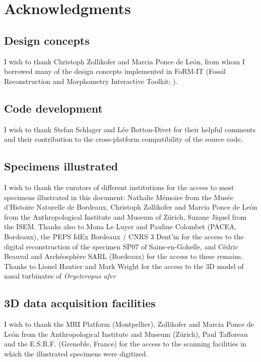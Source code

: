 
\chapter{Acknowledgments}
\minitoc 

\section {Design concepts}
I wish to thank Christoph Zollikofer and Marcia Ponce de León, from whom I borrowed many of the design concepts implemented in FoRM-IT (Fossil Reconstruction and Morphometry Interactive Toolkit; \citep{Zollikofer1995,Zollikofer2005}).

\section {Code development}
 I wish to thank Stefan Schlager and Léo Botton-Divet for their helpful comments and their contribution to the cross-platform compatibility of the source code.  

\section{Specimens illustrated} 
I wish to thank the curators of different institutions for the access to most specimens illustrated
in this document: Nathalie Mémoire from the Musée d'Histoire Naturelle de Bordeaux, Christoph
Zollikofer and Marcia Ponce de León from the Anthropological Institute and Museum of Zürich, Suzane Jiquel from the ISEM. Thanks also to Mona Le Luyer and Pauline Colombet (PACEA, Bordeaux),
the PEPS IdEx Bordeaux / CNRS 3 Dent'in for the access to the digital reconstruction of the specimen
SP07 of Sains-en-Gohelle, and Cédric Beauval and Archéosphère SARL (Bordeaux) for the access to
these remains. Thanks to Lionel Hautier and Mark Wright for the access to the 3D model of nasal turbinates of \textit{Orycteropus afer}

\section{3D data acquisition facilities} 
I wish to thank the MRI Platform (Montpellier), Zollikofer and Marcia Ponce de León from the
Anthropological Institute and Museum (Zürich), Paul Tafforeau and the E.S.R.F. (Grenoble, France) for
the access to the scanning facilities in which the illustrated specimens were digitized.
